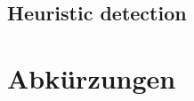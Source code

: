 \documentclass[conference,compsoc,final,a4paper]{IEEEtran}
\begin{document}
\subsection{Heuristic detection}

\section*{Abkürzungen}

\begin{acronym}[IEEE]
\end{acronym}

\printbibliography
\end{document}
